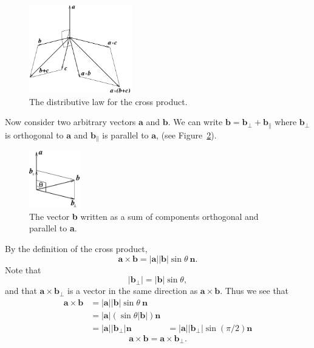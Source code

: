 {\begin{Solution}
\begin{figure}[htb!]
\begin{center}
  \includegraphics[width=0.4\textwidth]{algebra/vectors/crossdst}
\end{center}
\caption{The distributive law for the cross product.}
\label{crossdst}
\end{figure}

Now consider two arbitrary vectors $\mathbf{a}$ and $\mathbf{b}$.  We can write 
$\mathbf{b} = \mathbf{b}_\perp + \mathbf{b}_\parallel$ where $\mathbf{b}_\perp$ is 
orthogonal to $\mathbf{a}$ and $\mathbf{b}_\parallel$ is parallel to $\mathbf{a}$,
(see Figure~\ref{vperppar}).  

\begin{figure}[htb!]
\begin{center}
  \includegraphics[width=0.2\textwidth]{algebra/vectors/vperppar}
\end{center}
\caption{The vector \textbf{b} written as a sum of components orthogonal
  and parallel to \textbf{a}.}
\label{vperppar}
\end{figure}

By the definition of the cross product,
\[
\mathbf{a} \times \mathbf{b} = | \mathbf{a} | | \mathbf{b} | \sin \theta \ \mathbf{n}.
\]
Note that 
\[
| \mathbf{b}_\perp | = | \mathbf{b} | \sin \theta,
\]
and that $\mathbf{a} \times \mathbf{b}_\perp$ is a vector in the same direction
as $\mathbf{a} \times \mathbf{b}$.  Thus we see that
\begin{align*}
\mathbf{a} \times \mathbf{b} 
        &= | \mathbf{a} | | \mathbf{b} | \sin \theta \ \mathbf{n} \\
        &= | \mathbf{a} | ( \sin \theta  | \mathbf{b} | ) \mathbf{n} \\
        &= | \mathbf{a} | | \mathbf{b}_\perp | \mathbf{n} 
        &= | \mathbf{a} | | \mathbf{b}_\perp | \sin(\pi/2) \mathbf{n} 
\end{align*}
\[
\mathbf{a} \times \mathbf{b} = \mathbf{a} \times \mathbf{b}_\perp.
\]


\end{Solution}}
